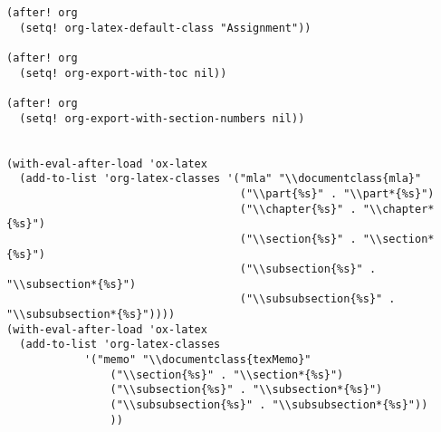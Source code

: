 \documentclass[11pt]{article}
\begin{document}
\begin{verbatim}
(after! org
  (setq! org-latex-default-class "Assignment"))

(after! org
  (setq! org-export-with-toc nil))

(after! org
  (setq! org-export-with-section-numbers nil))


(with-eval-after-load 'ox-latex
  (add-to-list 'org-latex-classes '("mla" "\\documentclass{mla}"
                                    ("\\part{%s}" . "\\part*{%s}")
                                    ("\\chapter{%s}" . "\\chapter*{%s}")
                                    ("\\section{%s}" . "\\section*{%s}")
                                    ("\\subsection{%s}" . "\\subsection*{%s}")
                                    ("\\subsubsection{%s}" . "\\subsubsection*{%s}"))))
(with-eval-after-load 'ox-latex
  (add-to-list 'org-latex-classes
            '("memo" "\\documentclass{texMemo}"
                ("\\section{%s}" . "\\section*{%s}")
                ("\\subsection{%s}" . "\\subsection*{%s}")
                ("\\subsubsection{%s}" . "\\subsubsection*{%s}"))
                ))
\end{verbatim}
\end{document}
